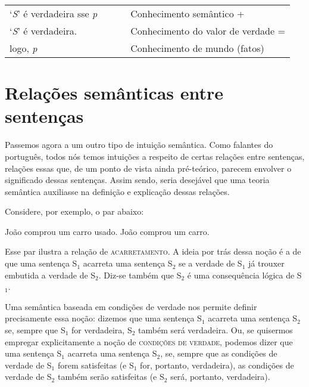 \n \begin{tabular}{l l l}

  `\textit{S}' é verdadeira sse \textit{p} & \ \ \  & Conhecimento semântico + \\

  `\textit{S}' é verdadeira. & \ \ \  & Conhecimento do valor de verdade = \\
  logo, \textit{p} & \ \ \  & Conhecimento de mundo (fatos) \\

\end{tabular}



\section{Relações semânticas entre sentenças}

Passemos agora a um outro tipo de intuição semântica. Como falantes do português, todos nós temos intuições a respeito
de certas relações entre sentenças, relações essas que, de um ponto
de vista ainda pré-teórico, parecem envolver o significado dessas
sentenças. Assim sendo, seria desejável que uma teoria semântica
auxiliasse na definição e explicação dessas relações.

Considere, por exemplo, o par abaixo:


\begin{exe}
    \ex\label{ac}
    \begin{xlist}
        \ex  João comprou um carro usado.\label{aca}
        \ex  João comprou um carro.\label{acb}
    \end{xlist}
\end{exe}

\n Esse par ilustra a relação de \textsc{acarretamento}. A ideia
por trás dessa noção é a de que uma sentença S$_{1}$ acarreta uma
sentença S$_{2}$ se a verdade de S$_{1}$ já trouxer embutida a verdade
de S$_{2}$. Diz-se também que S$_{2}$ é uma consequência lógica de
S$_{1}$.

Uma semântica baseada em condições de verdade nos permite definir
precisamente essa noção: dizemos que uma sentença S$_{1}$ acarreta
uma sentença S$_{2}$ se, sempre que S$_{1}$ for verdadeira, S$_{2}$
também será verdadeira. Ou, se quisermos empregar explicitamente a
no\-ção de \textsc{condi\-çõ\-es de verdade}, podemos dizer que
uma sentença S$_{1}$ acarreta uma sentença S$_{2}$, se, sempre que as
condi\-çõ\-es de verdade de S$_{1}$ forem satisfeitas (e S$_{1}$ for,
portanto, verdadeira), as condi\-çõ\-es de verdade de S$_{2}$ também
serão satisfeitas (e S$_{2}$ será, portanto, verdadeira).


